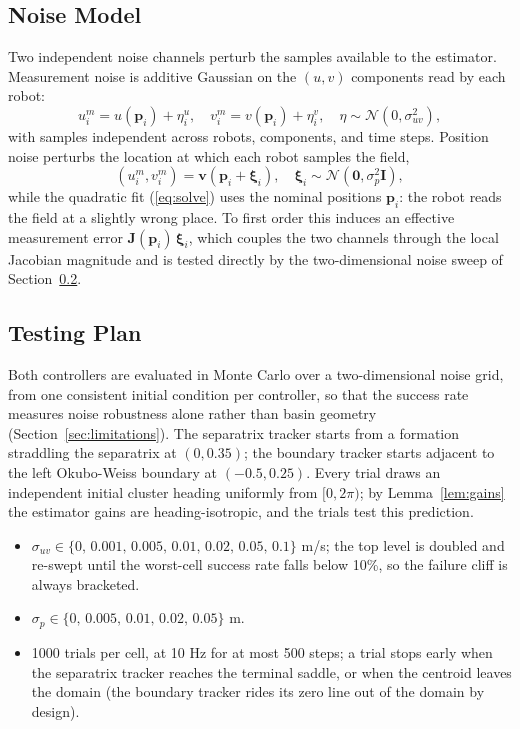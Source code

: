 \documentclass[12pt, letterpaper, oneside]{report}
\begin{document}
\subsection{Noise Model}
\label{sec:noise_model}

Two independent noise channels perturb the samples available to the
estimator. Measurement noise is additive Gaussian on the $(u, v)$
components read by each robot:
\begin{equation}
    u_i^m = u(\mathbf{p}_i) + \eta_i^u, \quad
    v_i^m = v(\mathbf{p}_i) + \eta_i^v,
    \quad \eta \sim \mathcal{N}(0, \sigma_{uv}^2),
    \label{eq:meas_noise}
\end{equation}
with samples independent across robots, components, and time steps.
Position noise perturbs the location at which each robot samples the
field,
\begin{equation}
    (u_i^m, v_i^m) = \mathbf{v}(\mathbf{p}_i + \boldsymbol{\xi}_i), \quad
    \boldsymbol{\xi}_i \sim \mathcal{N}(\mathbf{0}, \sigma_p^2 \mathbf{I}),
    \label{eq:pos_noise}
\end{equation}
while the quadratic fit (\ref{eq:solve}) uses the nominal positions
$\mathbf{p}_i$: the robot reads the field at a slightly wrong place. To
first order this induces an effective measurement error
$\mathbf{J}(\mathbf{p}_i)\,\boldsymbol{\xi}_i$, which couples the two
channels through the local Jacobian magnitude and is tested directly by
the two-dimensional noise sweep of Section~\ref{sec:test_plan}.

\subsection{Testing Plan}
\label{sec:test_plan}

Both controllers are evaluated in Monte Carlo over a two-dimensional
noise grid, from one consistent initial condition per controller, so
that the success rate measures noise robustness alone rather than basin
geometry (Section~\ref{sec:limitations}). The separatrix tracker starts
from a formation straddling the separatrix at $(0, 0.35)$; the boundary
tracker starts adjacent to the left Okubo-Weiss boundary at
$(-0.5, 0.25)$. Every trial draws an independent initial cluster heading
uniformly from $[0, 2\pi)$; by Lemma~\ref{lem:gains} the estimator gains
are heading-isotropic, and the trials test this prediction.
\begin{itemize}
    \item $\sigma_{uv} \in \{0,\, 0.001,\, 0.005,\, 0.01,\, 0.02,\,
          0.05,\, 0.1\}$ m/s; the top level is doubled and re-swept
          until the worst-cell success rate falls below 10\%, so the
          failure cliff is always bracketed.
    \item $\sigma_p \in \{0,\, 0.005,\, 0.01,\, 0.02,\, 0.05\}$ m.
    \item 1000 trials per cell, at 10 Hz for at most 500 steps; a trial
          stops early when the separatrix tracker reaches the terminal
          saddle, or when the centroid leaves the domain (the boundary
          tracker rides its zero line out of the domain by design).
\end{itemize}
\end{document}
